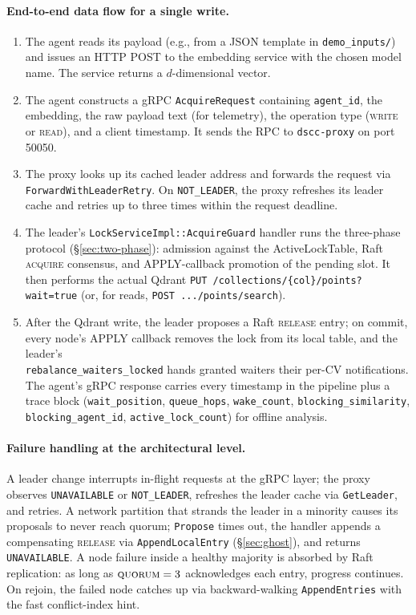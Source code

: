 \documentclass[sigconf]{acmart}
\begin{document}
\paragraph{\textbf{End-to-end data flow for a single write.}}
\begin{enumerate}
\item The agent reads its payload (e.g., from a JSON template in
  \texttt{demo\_inputs/}) and issues an HTTP POST to the embedding service
  with the chosen model name. The service returns a $d$-dimensional vector.
\item The agent constructs a gRPC \texttt{AcquireRequest} containing
  \texttt{agent\_id}, the embedding, the raw payload text (for telemetry),
  the operation type (\textsc{write} or \textsc{read}), and a client
  timestamp. It sends the RPC to \texttt{dscc-proxy} on port 50050.
\item The proxy looks up its cached leader address and forwards the request
  via \texttt{ForwardWithLeaderRetry}. On \texttt{NOT\_LEADER}, the proxy
  refreshes its leader cache and retries up to three times within the
  request deadline.
\item The leader's \texttt{LockServiceImpl::AcquireGuard} handler runs the
  three-phase protocol (\S\ref{sec:two-phase}): admission against the
  ActiveLockTable, Raft \textsc{acquire} consensus, and APPLY-callback
  promotion of the pending slot. It then performs the actual Qdrant
  \texttt{PUT /collections/\{col\}/points?wait=true} (or, for reads,
  \texttt{POST .../points/search}).
\item After the Qdrant write, the leader proposes a Raft
  \textsc{release} entry; on commit, every node's APPLY callback removes
  the lock from its local table, and the leader's \\
  \texttt{rebalance\_waiters\_locked} hands granted waiters their per-CV
  notifications. The agent's gRPC response carries every timestamp in the
  pipeline plus a trace block (\texttt{wait\_position},
  \texttt{queue\_hops}, \texttt{wake\_count}, \texttt{blocking\_similarity}, \\
  \texttt{blocking\_agent\_id}, \texttt{active\_lock\_count}) for offline
  analysis.
\end{enumerate}

\paragraph{\textbf{Failure handling at the architectural level.}}
A leader change interrupts in-flight requests at the gRPC layer; the proxy
observes \texttt{UNAVAILABLE} or \texttt{NOT\_LEADER}, refreshes the leader
cache via \texttt{GetLeader}, and retries. A network partition that strands
the leader in a minority causes its proposals to never reach quorum;
\texttt{Propose} times out, the handler appends a compensating
\textsc{release} via \texttt{AppendLocalEntry} (\S\ref{sec:ghost}), and
returns \texttt{UNAVAILABLE}. A node failure inside a healthy majority is
absorbed by Raft replication: as long as $\textsc{quorum}=3$ acknowledges
each entry, progress continues. On rejoin, the failed node catches up via
backward-walking \texttt{AppendEntries} with the fast conflict-index hint.
\end{document}
